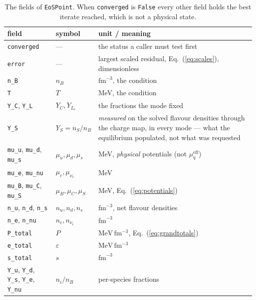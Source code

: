 \documentclass[aps,prc,onecolumn,superscriptaddress,nofootinbib,10pt]{revtex4-2}
\newcommand{\nB}{n_B}
\newcommand{\muB}{\mu_B}
\newcommand{\muC}{\mu_C}
\newcommand{\muS}{\mu_S}
\newcommand{\munue}{\mu_{\nu_e}}
\newcommand{\mueff}[1]{\mu^{\mathrm{eff}}_{#1}}
\begin{document}
\begin{table}[h]
\centering
\begin{tabular}{lll}
\toprule
field & symbol & unit / meaning \\
\midrule
\texttt{converged} & --- & the status a caller must test first \\
\texttt{error}     & --- & largest scaled residual, Eq.~(\ref{eq:scales}),
                           dimensionless \\
\midrule
\texttt{n\_B}      & $\nB$        & $\mathrm{fm}^{-3}$, the condition \\
\texttt{T}         & $T$          & MeV, the condition \\
\texttt{Y\_C}, \texttt{Y\_L}
                   & $Y_C, Y_{L_e}$ & the fractions the mode fixed \\
\texttt{Y\_S}      & $Y_S = n_S/\nB$ & \emph{measured} on the solved flavour
                                       densities through the charge map, in
                                       every mode --- what the equilibrium
                                       populated, not what was requested \\
\midrule
\texttt{mu\_u}, \texttt{mu\_d}, \texttt{mu\_s}
                   & $\mu_u, \mu_d, \mu_s$ & MeV, \emph{physical} potentials
                                             (not $\mueff{q}$) \\
\texttt{mu\_e}, \texttt{mu\_nu}
                   & $\mu_e, \munue$ & MeV \\
\texttt{mu\_B}, \texttt{mu\_C}, \texttt{mu\_S}
                   & $\muB, \muC, \muS$ & MeV, Eq.~(\ref{eq:potentials}) \\
\midrule
\texttt{n\_u}, \texttt{n\_d}, \texttt{n\_s}
                   & $n_u, n_d, n_s$ & $\mathrm{fm}^{-3}$, net flavour
                                       densities \\
\texttt{n\_e}, \texttt{n\_nu}
                   & $n_e, n_{\nu_e}$ & $\mathrm{fm}^{-3}$ \\
\midrule
\texttt{P\_total}  & $P$           & $\mathrm{MeV\,fm^{-3}}$,
                                     Eq.~(\ref{eq:grandtotals}) \\
\texttt{e\_total}  & $\varepsilon$ & $\mathrm{MeV\,fm^{-3}}$ \\
\texttt{s\_total}  & $s$           & $\mathrm{fm}^{-3}$ \\
\midrule
\texttt{Y\_u}, \texttt{Y\_d}, \texttt{Y\_s}, \texttt{Y\_e}, \texttt{Y\_nu}
                   & $n_i/\nB$     & per-species fractions \\
\bottomrule
\end{tabular}
\caption{The fields of \texttt{EoSPoint}. When \texttt{converged} is
         \texttt{False} every other field holds the best iterate reached,
         which is not a physical state.}
\label{tab:returns}
\end{table}
\end{document}
